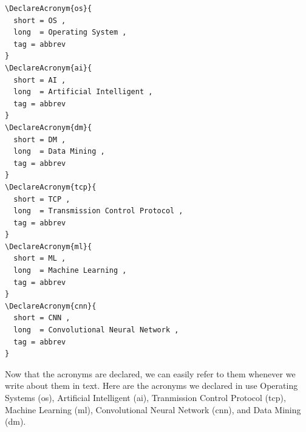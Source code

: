 \begin{lstlisting}[language=Tex,style=mystyle,caption={Sample Acronyms Declarations},label={lst:acronyms}]
\DeclareAcronym{os}{
  short = OS ,
  long  = Operating System ,
  tag = abbrev
}
\DeclareAcronym{ai}{
  short = AI ,
  long  = Artificial Intelligent ,
  tag = abbrev
}
\DeclareAcronym{dm}{
  short = DM ,
  long  = Data Mining ,
  tag = abbrev
}
\DeclareAcronym{tcp}{
  short = TCP ,
  long  = Transmission Control Protocol ,
  tag = abbrev
}
\DeclareAcronym{ml}{
  short = ML ,
  long  = Machine Learning ,
  tag = abbrev
}
\DeclareAcronym{cnn}{
  short = CNN ,
  long  = Convolutional Neural Network ,
  tag = abbrev
}
\end{lstlisting}


Now that the acronyms are declared, we can easily refer to them whenever we write about them in text. Here are the acronyms we declared in use Operating Systems (\ac{os}), Artificial Intelligent (\ac{ai}), Tranmission Control Protocol (\ac{tcp}), Machine Learning (\ac{ml}), Convolutional Neural Network (\ac{cnn}), and Data Mining (\ac{dm}). 